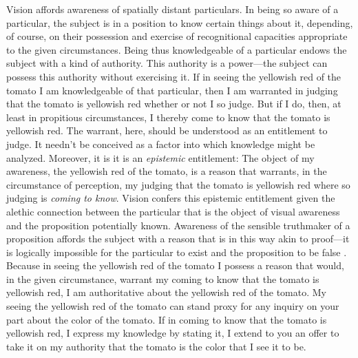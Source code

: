\documentclass[12pt]{article}
\begin{document}
Vision affords awareness of spatially distant particulars. %
In being so aware of a particular, the subject is in a position to know certain things about it, depending, of course, on their possession and exercise of recognitional capacities appropriate to the given circumstances. Being thus knowledgeable of a particular endows the subject with a kind of authority. This authority is a power---the subject can possess this authority without exercising it. If in seeing the yellowish red of the tomato I am knowledgeable of that particular, then I am warranted in judging that the tomato is yellowish red whether or not I so judge. But if I do, then, at least in propitious circumstances, I thereby come to know that the tomato is yellowish red. The warrant, here, should be understood as an entitlement to judge. It needn't be conceived as a factor into which knowledge might be analyzed. Moreover, it is it is an \emph{epistemic} entitlement: The object of my awareness, the yellowish red of the tomato, is a reason that warrants, in the circumstance of perception, my judging that the tomato is yellowish red where so judging is \emph{coming to know}. Vision confers this epistemic entitlement given the alethic connection between the particular that is the object of visual awareness and the proposition potentially known. Awareness of the sensible truthmaker of a proposition affords the subject with a reason that is in this way akin to proof---it is logically impossible for the particular to exist and the proposition to be false \citep[see][]{Cook-Wilson:1926sf,Kalderon:2010fk}. Because in seeing the yellowish red of the tomato I possess a reason that would, in the given circumstance, warrant my coming to know that the tomato is yellowish red, I am authoritative about the yellowish red of the tomato. My seeing the yellowish red of the tomato can stand proxy for any inquiry on your part about the color of the tomato. If in coming to know that the tomato is yellowish red, I express my knowledge by stating it, I extend to you an offer to take it on my authority that the tomato is the color that I see it to be. 
\end{document}
